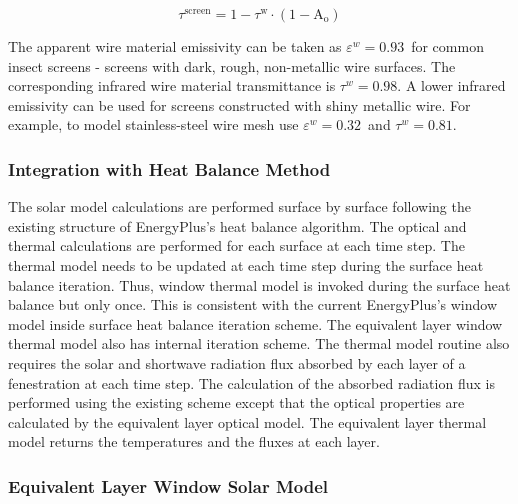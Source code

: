 {\begin{equation}
{\tau ^{{\mathrm{screen}}}} = {\mathrm{1 - }}{\tau ^{\mathrm{w}}} \cdot \left( {{\mathrm{1  -  }}{{\mathrm{A}}_{\mathrm{o}}}} \right)
\end{equation}

The apparent wire material emissivity can be taken as $\varepsilon^w = 0.93$\ for common insect screens - screens with dark, rough, non-metallic wire surfaces. The corresponding infrared wire material transmittance is $\tau^w = 0.98$. A lower infrared emissivity can be used for screens constructed with shiny metallic wire. For example, to model stainless-steel wire mesh use $\varepsilon^w = 0.32$\ and $\tau^w = 0.81$.

\subsubsection{Integration with Heat Balance Method}\label{integration-with-heat-balance-method}

The solar model calculations are performed surface by surface following the existing structure of EnergyPlus's heat balance algorithm. The optical and thermal calculations are performed for each surface at each time step. The thermal model needs to be updated at each time step during the surface heat balance iteration. Thus, window thermal model is invoked during the surface heat balance but only once. This is consistent with the current EnergyPlus's window model inside surface heat balance iteration scheme. The equivalent layer window thermal model also has internal iteration scheme. The thermal model routine also requires the solar and shortwave radiation flux absorbed by each layer of a fenestration at each time step. The calculation of the absorbed radiation flux is performed using the existing scheme except that the optical properties are calculated by the equivalent layer optical model. The equivalent layer thermal model returns the temperatures and the fluxes at each layer.

\subsubsection{Equivalent Layer Window Solar Model}\label{equivalent-layer-window-solar-model}

}
